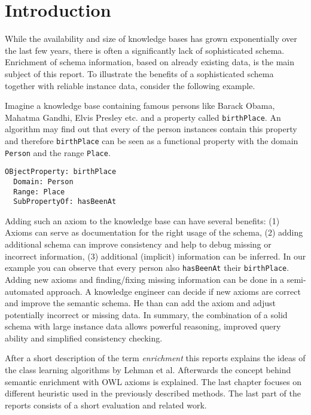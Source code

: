 \section{Introduction}
While the availability and size of knowledge bases has grown exponentially over
the last few years, there is often a significantly lack of sophisticated
schema.
Enrichment of schema information, based on already existing data, is the main
subject of this report.
To illustrate the benefits of a sophisticated schema together with reliable
instance data, consider the following example.

\begin{example}
Imagine a knowledge base containing famous persons like Barack Obama, Mahatma
Gandhi, Elvis Presley etc. and a property called \texttt{birthPlace}. An
algorithm may find out that every of the person instances contain this property
and therefore \texttt{birthPlace} can be seen as a functional property with the
domain \texttt{Person} and the range \texttt{Place}.\\
\vspace{0.90 cm}
\begin{verbatim}
OBjectProperty: birthPlace
  Domain: Person
  Range: Place
  SubPropertyOf: hasBeenAt
\end{verbatim}
\end{example}
\vspace{-0.4 cm}

Adding such an axiom to the knowledge base can have several benefits:
(1) Axioms can serve as documentation for the right usage of the
schema, (2) adding additional schema can improve consistency and help to debug missing or incorrect
information, (3) additional (implicit) information can be inferred. In our
example you can observe that every person also \texttt{hasBeenAt} their
\texttt{birthPlace}.
Adding new axioms and finding/fixing missing information can be done in a
semi-automated approach. A knowledge engineer can decide if new axioms are
correct and improve the semantic schema. He than can add the axiom and adjust
potentially incorrect or missing data. \cite{paper2}
In summary, the combination of a solid schema with large instance data allows
powerful reasoning, improved query ability and simplified consistency checking. 

After a short description of the term \emph{enrichment} this reports explains
the ideas of the class learning algorithms by Lehman et al. Afterwards the
concept behind semantic enrichment with OWL axioms is explained. The last
chapter focuses on different heuristic used in the previously described methods.
The last part of the reports consists of a short evaluation and related work.
